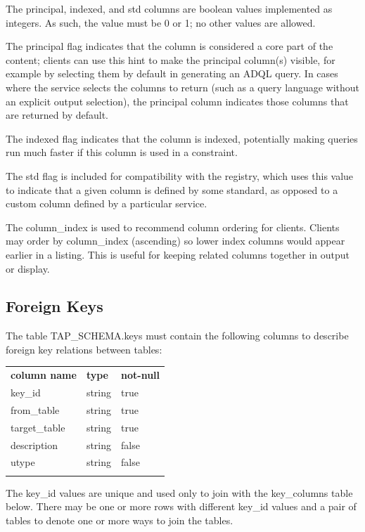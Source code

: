 \documentclass[11pt,letter]{ivoa}
\newcommand{\tapschema}{TAP\_SCHE\-MA}
\newcommand{\tapschema}{\mbox{%
  \relsize{-0.5}TAP\discretionary{-}{}{\kern-2pt\_}SCHEMA}}
\begin{document}
The principal, indexed, and std columns are boolean values implemented as integers. As such, 
the value must be 0 or 1; no other values are allowed.

The principal flag indicates that the column is considered a core part of the 
content; clients can use this hint to make the principal column(s) visible, for 
example by selecting them by default in generating an ADQL query. In cases where 
the service selects the columns to return (such as a query language without an 
explicit output selection), the principal column indicates those columns that 
are returned by default. 

The indexed flag indicates that the column is indexed, potentially 
making queries run much faster if this column is used in a constraint. 

The std flag is included for compatibility with the registry, which uses this value 
to indicate that a given column is defined by some standard, as opposed to a 
custom column defined by a particular service.

The column\_index is used to recommend column ordering for clients. Clients 
may order by column\_index (ascending) so lower index columns would appear 
earlier in a listing. This is useful for keeping related columns together in 
output or display.

\subsection{Foreign Keys}
\label{sec:tap-schema-keys}
The table \tapschema.keys must contain the following columns to 
describe foreign key relations between tables:

\begin{inlinetable}
\begin{tabular}{l l l}
\sptablerule
\textbf{column name} & \textbf{type} & \textbf{not-null} \\
\sptablerule
key\_id & string & true \\
from\_table & string & true \\
target\_table & string & true \\
description & string & false \\
utype & string & false \\
\sptablerule
\end{tabular}
\end{inlinetable}

The key\_id values are unique and used only to join with the 
key\_columns table below. There may be 
one or more rows with different key\_id values and a pair 
of tables to denote one or more ways to join the tables.
\end{document}
